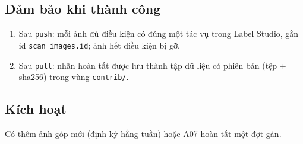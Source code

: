 \subsection{Đảm bảo khi thành công}
\begin{enumerate}
\item Sau {\small\texttt{push}}: mỗi ảnh đủ điều kiện có đúng một tác vụ trong Label Studio, gắn id {\small\texttt{scan\_\allowbreak{}\allowbreak{}images.\allowbreak{}id}}; ảnh hết điều kiện bị gỡ.
\item Sau {\small\texttt{pull}}: nhãn hoàn tất được lưu thành tập dữ liệu có phiên bản (tệp + sha256) trong vùng {\small\texttt{contrib/\allowbreak{}\allowbreak{}}}.
\end{enumerate}
\subsection{Kích hoạt}
Có thêm ảnh góp mới (định kỳ hằng tuần) hoặc A07 hoàn tất một đợt gán.

